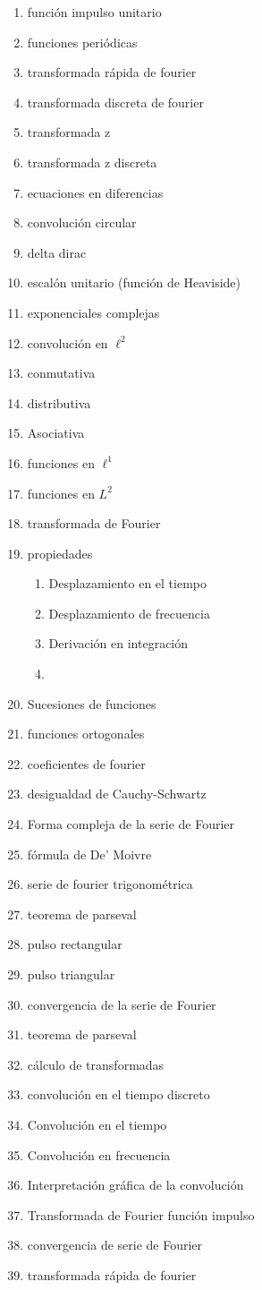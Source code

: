 \documentclass[landscape]{article}
\begin{document}
\begin{enumerate}
\item 	funci\'on impulso unitario
\item	funciones peri\'odicas
\item	transformada r\'apida de fourier
\item	transformada discreta de fourier
\item	transformada z
\item	transformada z discreta
\item	ecuaciones en diferencias
\item	convoluci\'on circular
\item	delta dirac
\item   escal\'on unitario (funci\'on de Heaviside)
\item	exponenciales complejas
\item	convoluci\'on en $\ell^2$
\item		conmutativa
\item		distributiva
\item		Asociativa
\item		funciones en $\ell^1$
\item	funciones en $L^2$
\item	transformada de Fourier
\item		propiedades
	\begin{enumerate}
		\item Desplazamiento en el tiempo
		\item Desplazamiento de frecuencia
		\item Derivaci\'on en integraci\'on
		\item 
	\end{enumerate}		
\item	Sucesiones de funciones
\item	funciones ortogonales
\item	coeficientes de fourier
\item	desigualdad de Cauchy-Schwartz
\item	Forma compleja de la serie de Fourier
\item	f\'ormula de De' Moivre
\item	serie de fourier trigonom\'etrica
\item	teorema de parseval
\item	pulso rectangular
\item	pulso triangular
\item	convergencia de la serie de Fourier
\item	teorema de parseval
\item	c\'alculo de transformadas
\item	convoluci\'on en el tiempo discreto
\item 	Convoluci\'on en el tiempo
\item 	Convoluci\'on en frecuencia
\item   Interpretaci\'on gr\'afica de la convoluci\'on
\item	Transformada de Fourier funci\'on impulso
\item	convergencia de serie de Fourier
\item   transformada r\'apida de fourier
\end{enumerate}
\end{document}
